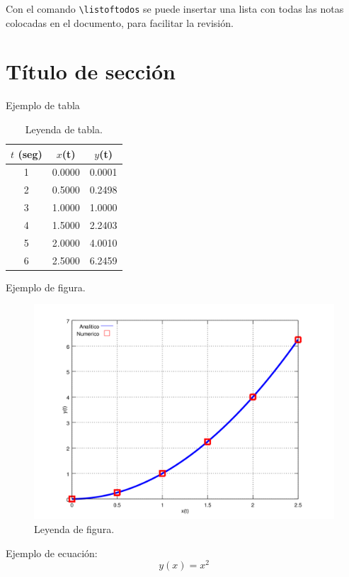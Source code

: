 Con el comando \verb|\listoftodos| se puede insertar una lista con todas las notas colocadas en el documento, para facilitar la revisión.
\listoftodos

\section{Título de sección}

Ejemplo de tabla

\begin{table}[h!]
\centering
\caption{Leyenda de tabla.}
\label{tab:comp}
\begin{tabular}{|c|c|c|}
  \hline
  $t$ (seg) & $x$(t) & $y$(t)\\
  \hline
  1 & 0.0000 & 0.0001\\
  2 & 0.5000 & 0.2498\\
  3 & 1.0000 & 1.0000\\
  4 & 1.5000 & 2.2403\\
  5 & 2.0000 & 4.0010\\
  6 & 2.5000 & 6.2459\\
  \hline
\end{tabular}
\end{table}

Ejemplo de figura.

\begin{figure}[h!]
\label{fig:comp}
\includegraphics[width=.8\textwidth]{imagenes/chap4/x_vs_y}
\caption{Leyenda de figura.}
\end{figure}
Ejemplo de ecuación:
\begin{equation}
y(x)=x^2
\end{equation}
